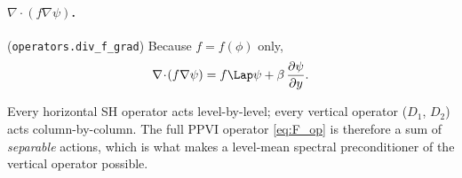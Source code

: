 \paragraph{$\nabla\!\cdot\!(f\nabla\psi)$.} (\texttt{operators.div\_f\_grad})
Because $f=f(\phi)$ only,
\begin{equation}
\nabla\!\cdot\!(f\nabla\psi)=f\Lap\psi+\beta\,\frac{\partial\psi}{\partial y}.
\end{equation}

\begin{keybox}
Every horizontal SH operator acts level-by-level; every vertical
operator ($D_1$, $D_2$) acts column-by-column.  The full PPVI operator
\cref{eq:F_op} is therefore a sum of \emph{separable} actions, which
is what makes a level-mean spectral preconditioner of the vertical
operator possible.
\end{keybox}
